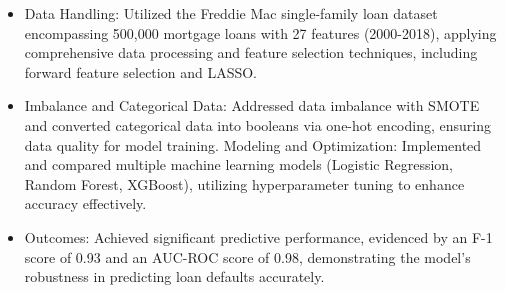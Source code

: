 \documentclass{resume}
\newcommand{\en}[1]{#1}
\begin{document}
\begin{itemize}[parsep=0.25ex]
            \begin{itemize}
                  \item Data Handling: Utilized the Freddie Mac single-family loan dataset encompassing 500,000 mortgage loans with 27 features (2000-2018), applying comprehensive data processing and feature selection techniques, including forward feature selection and LASSO.
                 \item Imbalance and Categorical Data: Addressed data imbalance with SMOTE and converted categorical data into booleans via one-hot encoding, ensuring data quality for model training.
                  Modeling and Optimization: Implemented and compared multiple machine learning models (Logistic Regression, Random Forest, XGBoost), utilizing hyperparameter tuning to enhance accuracy effectively.
                  \item Outcomes: Achieved significant predictive performance, evidenced by an F-1 score of 0.93 and an AUC-ROC score of 0.98, demonstrating the model's robustness in predicting loan defaults accurately.
                  
                  

            \end{itemize}
\end{itemize}
\end{document}
